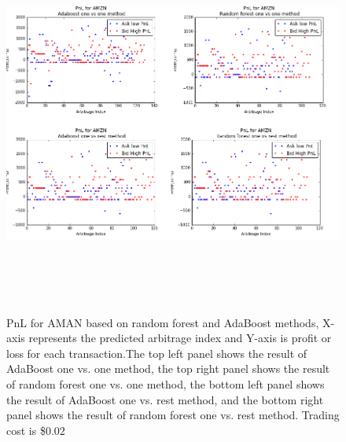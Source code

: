 \begin{figure} [hp]
  \begin{center}
    \includegraphics[width=6in,  height=5in]{figures/amzn_pnl.png}
  \end{center}
\caption{PnL for AMAN based on random forest and AdaBoost methods,    X-axis represents the predicted arbitrage index and Y-axis is profit or loss for each transaction.The top left panel shows the result of AdaBoost one vs. one method,   the top right panel shows the result of random forest one vs. one method,  the bottom left panel shows the result of AdaBoost one vs. rest method,   and the bottom right panel shows the result of random forest one vs. rest method. Trading cost is \$0.02} \label{fig:amzn_pnl}
\end{figure}

